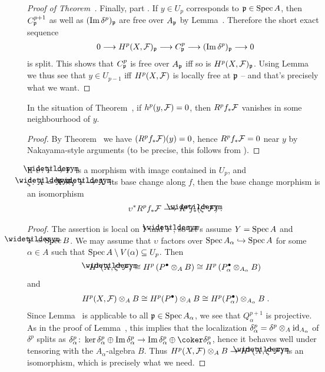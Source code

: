 \documentclass[a4paper,parskip=half,numbers=enddot, DIV=12]{scrreprt}
\begin{document}
\begin{proof}[Proof of Theorem~]
	Finally, part . If $y\in U_p$ corresponds to $\mathfrak{p}\in\operatorname{Spec} A$, then $C_{\mathfrak{p}}^{p+1}$ as well as $(\operatorname{Im} \delta^p)_{\mathfrak{p}}$ are free over $A_{\mathfrak{p}}$ by Lemma~. Therefore the short exact sequence
	\begin{align*}
		0\morphism H^p(X,\Ff)_\pp\morphism C_\pp^p\morphism (\Im\delta^p)_\pp\morphism 0
	\end{align*}
	is split. This shows that $C_{\mathfrak{p}}^p$ is free over $A_{\mathfrak{p}}$ iff so is $H^p(X,\mathcal{F})_{\mathfrak{p}}$. Using Lemma~ we thus see that $y\in U_{p-1}$ iff $H^p(X,\mathcal{F})$ is locally free at $\mathfrak{p}$ -- and that's precisely what we want.
\end{proof}
\begin{cor}
	In the situation of Theorem~, if $h^p(y,\mathcal{F})=0$, then $R^pf_*\mathcal{F}$ vanishes in some neighbourhood of $y$.
\end{cor}
\begin{proof}
	By Theorem~ we have $(R^pf_*\mathcal{F})(y)=0$, hence $R^pf_*\mathcal{F}=0$ near $y$ by Nakayama-style arguments (to be precise, this follows from \cite[Corollary~1.5.1]{alg2}).
\end{proof}
\begin{cor}
	If $\upsilon\colon \snake{Y}\morphism Y$ is a morphism with image contained in $U_p$, and $\xi\colon \snake{X}=X\times_Y\snake{Y}\morphism X$ its base change along $f$, then the base change morphism is an isomorphism
	\begin{align*}
		\upsilon^*R^pf_*\Ff\isomorphism R^p\snake{f}_*(\xi^*\Ff)\;.
	\end{align*}
\end{cor}
\begin{proof}
	The assertion is local on $Y$ and $\snake{Y}$, so let's assume $Y=\operatorname{Spec} A$ and $\snake{Y}=\Spec B$. We may assume that $\upsilon$ factors over $\Spec A_\alpha\monomorphism \Spec A$ for some $\alpha\in A$ such that $\operatorname{Spec} A\setminus V(\alpha)\subseteq U_p$. Then
	\begin{align*}
		H^p(\snake{X},\xi^*\Ff)\cong H^p\left(P^\bullet\otimes_AB\right)\cong H^p\left(P_\alpha^\bullet\otimes_{A_\alpha}B\right)
	\end{align*}
	and
	\begin{align*}
		H^p(X,\mathcal{F})\otimes_AB\cong H^p(P^\bullet)\otimes_AB\cong H^p(P_\alpha^\bullet)\otimes_{A_\alpha}B\;.
	\end{align*}
	Since Lemma~ is applicable to all $\mathfrak{p}\in \operatorname{Spec} A_\alpha$, we see that $Q_\alpha^{p+1}$ is projective. As in the proof of Lemma~, this implies that the localization $\delta_\alpha^p=\delta^p\otimes_A\operatorname{id}_{A_\alpha}$ of $\delta^p$ splits as $\delta_\alpha^p\colon \ker\delta_\alpha^p\oplus \Im \delta_\alpha^p\morphism \Im\delta_\alpha^p\oplus\coker\delta_\alpha^p$, hence it behaves well under tensoring with the $A_\alpha$-algebra $B$. Thus $H^p(X,\Ff)\otimes_AB\morphism H^p(\snake{X},\xi^*\Ff)$ is an isomorphism, which is precisely what we need.
\end{proof}
\end{document}
